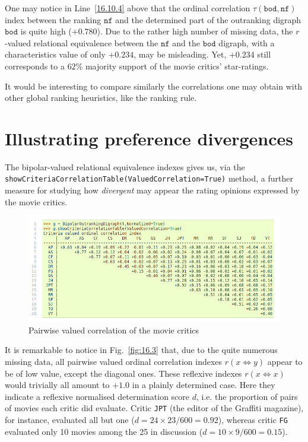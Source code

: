 One may notice in Line~\ref{16.10.4} above that the ordinal correlation $\tau(\mathtt{bod},\mathtt{nf})$ index between the \NetFlows ranking $\mathtt{nf}$ and the determined part of the outranking digraph $\mathtt{bod}$ is quite high ($+0.780$). Due to the rather high number of missing data, the $r$ -valued relational equivalence between the $\mathtt{nf}$ and the $\mathtt{bod}$ digraph, with a characteristics value of only $+0.234$, may be misleading. Yet, $+0.234$ still corresponds to a $62\%$ majority support of the movie critics' star-ratings.

It would be interesting to compare similarly the correlations one may obtain with other global ranking heuristics, like the \Copeland ranking rule.

\section{Illustrating preference divergences}
\label{sec:16.5}

The bipolar-valued relational equivalence indexes gives us, via the \texttt{showCrite\-riaCorrelationTable(ValuedCorrelation=True)} method, a further measure for studying how \emph{divergent} may appear the rating opinions expressed by the movie critics. 
\begin{figure}[ht]
\includegraphics[width=\hsize]{Figures/16-3-correlationTable.png}
\caption{Pairwise valued correlation of the movie critics} 
\label{fig:16.3}       %
\end{figure}

It is remarkable to notice in Fig.~\vref{fig:16.3} that, due to the quite numerous missing data, all pairwise valued ordinal correlation indexes $r(x\Leftrightarrow y)$ appear to be of low value, except the diagonal ones. These reflexive indexes $r(x\Leftrightarrow x)$ would trivially all amount to $+1.0$ in a plainly determined case. Here they indicate a reflexive normalised determination score $d$, i.e. the proportion of pairs of movies each critic did evaluate. Critic \texttt{JPT} (the editor of the Graffiti magazine), for instance, evaluated all but one ($d = 24\times23/600 = 0.92$), whereas critic \texttt{FG} evaluated only 10 movies among the 25 in discussion ($d = 10\times9/600 = 0.15$).

